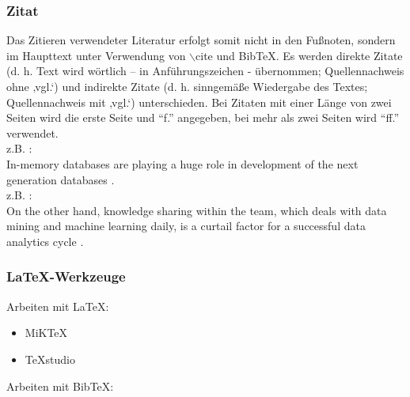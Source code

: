 \documentclass[11pt]{scrartcl}
\newcommand{\href}[2]{#2}
\begin{document}
\subsubsection{Zitat}
Das Zitieren verwendeter Literatur erfolgt somit nicht in den Fußnoten, sondern im Haupttext unter Verwendung von $\backslash$cite und BibTeX. Es werden direkte Zitate (d. h. Text wird wörtlich – in Anführungszeichen - übernommen; Quellennachweis ohne ‚vgl.‘) und indirekte Zitate (d. h. sinngemäße Wiedergabe des Textes; Quellennachweis mit ‚vgl.‘) unterschieden. Bei Zitaten mit einer Länge von zwei Seiten wird die erste Seite und "`f."' angegeben, bei mehr als zwei Seiten wird "`ff."' verwendet. \\

z.B. : \\

In-memory databases are playing a huge role in development of the next generation databases \citep{VDInMemory:14}. \\

z.B. : \\

On the other hand, knowledge sharing within the team, which deals with data mining and machine learning daily, is a curtail factor for a successful data analytics cycle \citep{ScalingAirbnb:2015}.


\subsubsection{LaTeX-Werkzeuge}

Arbeiten mit LaTeX:

\begin{itemize}
	\item \href{https://miktex.org/}{MiKTeX}
	\item \href{http://www.texstudio.org/}{TeXstudio}
\end{itemize}

Arbeiten mit BibTeX:
\end{document}
